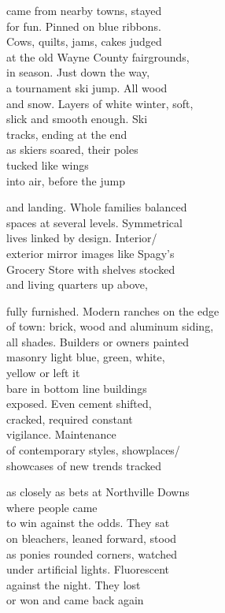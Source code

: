 \documentclass[twoside,10pt]{book}
\begin{document}
came from nearby towns, stayed\\
for fun. Pinned on blue ribbons.\\
Cows, quilts, jams, cakes judged\\
at the old Wayne County fairgrounds,\\
in season. Just down the way,\\
a tournament ski jump. All wood\\
and snow. Layers of white winter, soft,\\
slick and smooth enough. Ski\\
tracks, ending at the end\\
as skiers soared, their poles\\
tucked like wings\\
into air, before the jump

and landing. Whole families balanced\\
spaces at several levels. Symmetrical\\
lives linked by design. Interior/\\
exterior mirror images like Spagy's\\
Grocery Store with shelves stocked\\
and living quarters up above,

fully furnished. Modern ranches on the edge\\
of town: brick, wood and aluminum siding,\\
all shades. Builders or owners painted\\
masonry light blue, green, white,\\
yellow or left it\\
bare in bottom line buildings\\
exposed. Even cement shifted,\\
cracked, required constant\\
vigilance. Maintenance\\
of contemporary styles, showplaces/\\
showcases of new trends tracked

as closely as bets at Northville Downs\\
where people came\\
to win against the odds. They sat\\
on bleachers, leaned forward, stood\\
as ponies rounded corners, watched\\
under artificial lights. Fluorescent\\
against the night. They lost\\
or won and came back again
\end{document}
